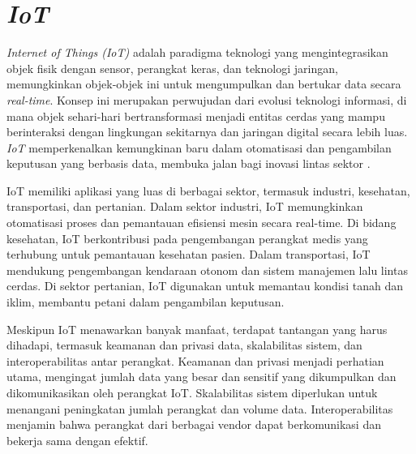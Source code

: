 \section{\textit{IoT}}

\textit{Internet of Things (IoT)} adalah paradigma teknologi yang mengintegrasikan objek fisik dengan sensor, perangkat keras, dan teknologi jaringan, memungkinkan objek-objek ini untuk mengumpulkan dan bertukar data secara \textit{real-time}. Konsep ini merupakan perwujudan dari evolusi teknologi informasi, di mana objek sehari-hari bertransformasi menjadi entitas cerdas yang mampu berinteraksi dengan lingkungan sekitarnya dan jaringan digital secara lebih luas. \textit{IoT} memperkenalkan kemungkinan baru dalam otomatisasi dan pengambilan keputusan yang berbasis data, membuka jalan bagi inovasi lintas sektor \parencite{madakam2015internet}.

IoT memiliki aplikasi yang luas di berbagai sektor, termasuk industri, kesehatan, transportasi, dan pertanian. Dalam sektor industri, IoT memungkinkan otomatisasi proses dan pemantauan efisiensi mesin secara real-time. Di bidang kesehatan, IoT berkontribusi pada pengembangan perangkat medis yang terhubung untuk pemantauan kesehatan pasien. Dalam transportasi, IoT mendukung pengembangan kendaraan otonom dan sistem manajemen lalu lintas cerdas. Di sektor pertanian, IoT digunakan untuk memantau kondisi tanah dan iklim, membantu petani dalam pengambilan keputusan.

Meskipun IoT menawarkan banyak manfaat, terdapat tantangan yang harus dihadapi, termasuk keamanan dan privasi data, skalabilitas sistem, dan interoperabilitas antar perangkat. Keamanan dan privasi menjadi perhatian utama, mengingat jumlah data yang besar dan sensitif yang dikumpulkan dan dikomunikasikan oleh perangkat IoT. Skalabilitas sistem diperlukan untuk menangani peningkatan jumlah perangkat dan volume data. Interoperabilitas menjamin bahwa perangkat dari berbagai vendor dapat berkomunikasi dan bekerja sama dengan efektif.